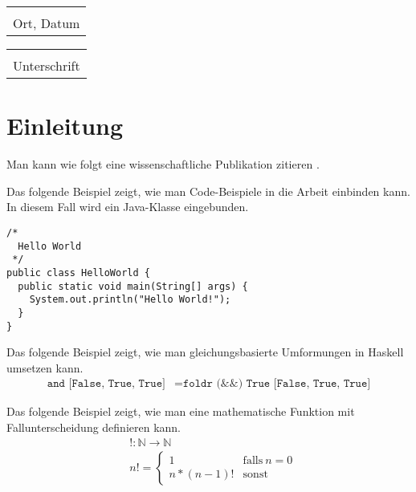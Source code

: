 \documentclass[a4paper, 10pt, DIV=13, BCOR=8mm]{scrbook}
\makeatletter
\newcommand{\hs}[1]{\texttt{#1}}
\newcommand{\signature}{%
\noindent%
\begin{tabular}{@{}p{5cm}@{}}
  \\[5\normalbaselineskip]
  \hline
  \\[-.75\normalbaselineskip]
  Ort, Datum
\end{tabular}\hspace{2ex}
\begin{tabular}{@{}p{3.1in}@{}}
  \\[5\normalbaselineskip]
  \hline
  \\[-.75\normalbaselineskip]
  Unterschrift
\end{tabular}
}
\makeatother
\begin{document}
\signature{}


\tableofcontents


\chapter{Einleitung}

Man kann wie folgt eine wissenschaftliche Publikation zitieren \cite{christiansen2019verifying}.

\blindtext

Das folgende Beispiel zeigt, wie man Code-Beispiele in die Arbeit einbinden kann.
In diesem Fall wird ein Java-Klasse eingebunden.
\begin{verbatim}
/*
  Hello World
 */
public class HelloWorld {
  public static void main(String[] args) {
    System.out.println("Hello World!");
  }
}
\end{verbatim}

\blindtext

Das folgende Beispiel zeigt, wie man gleichungsbasierte Umformungen in Haskell umsetzen kann.
\begin{align*}
\hs{and [False, True, True]} &= \hs{foldr (&&) True [False, True, True]}
\end{align*}

\blindtext

Das folgende Beispiel zeigt, wie man eine mathematische Funktion mit Fallunterscheidung definieren kann.
\begin{align*}
& !\colon \mathbb{N} \to \mathbb{N}\\
& n! = \begin{cases}
  1 & \mbox{falls}~n = 0\\
  n * (n-1)! & \mbox{sonst}
\end{cases}
\end{align*}

\blindtext



\end{document}
